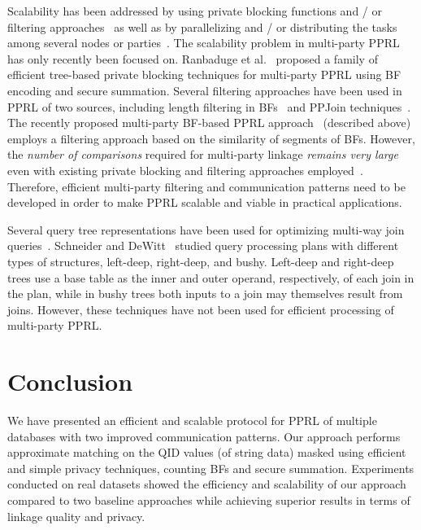 \documentclass{sig-alternate}
\begin{document}
Scalability has been addressed by using private blocking functions and / or
filtering approaches~\cite{Vat13,Vat16d} as well as by parallelizing and / or distributing
the tasks among several nodes or parties~\cite{Kara13,Vat16d}. 
The scalability problem in multi-party PPRL
has only recently been focused on. Ranbaduge et al.~\cite{Ran15,Ran16} proposed 
a family of efficient tree-based private blocking techniques for multi-party PPRL
using BF encoding and secure summation. Several filtering approaches have
been used in PPRL of two sources, including 
length filtering in BFs~\cite{Vat12} and
PPJoin techniques~\cite{Seh15}. 
The recently proposed multi-party
BF-based 
PPRL approach~\cite{Vat14c,Vat16c} (described above)
employs a filtering approach based on the similarity of
segments of BFs.
However, the \emph{number of comparisons} required for multi-party linkage
\emph{remains very large} even with existing private blocking and
filtering approaches employed~\cite{Ran15,Vat14c}. 
Therefore, efficient multi-party filtering and communication patterns
need to be developed 
in order to make PPRL scalable and viable in practical applications.

Several query tree representations 
have been used for optimizing multi-way join
queries~\cite{Lu91,Sch90}. 
Schneider and DeWitt~\cite{Sch90} studied query processing plans with
different types of structures, left-deep, right-deep, and bushy.
Left-deep and right-deep trees use a base table as the inner
and outer operand, respectively, of each join in the plan, while
in bushy trees both inputs to a join may themselves result from joins.
However, these techniques have not been used
for efficient processing of multi-party PPRL.



\section{Conclusion}
\label{sec:con}

We have presented an efficient and scalable
protocol for PPRL of multiple databases
with two improved communication patterns.
Our approach performs approximate matching
on the QID values (of string data)
masked using efficient and simple privacy techniques,
counting BFs and secure summation.
Experiments conducted on real datasets
showed the efficiency and scalability of
our approach compared to two baseline approaches
while achieving superior results 
in terms of linkage quality and privacy.
\end{document}
